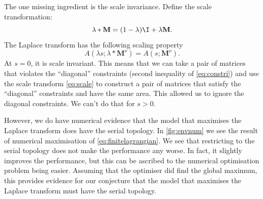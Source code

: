 \documentclass[12pt]{article}
\newcommand{\M}{\mathbf{M}}
\begin{document}
The one missing ingredient is the scale invariance.
Define the scale transformation:
%
\begin{equation}\label{eq:scale}
  \lambda * \M = (1-\lambda)\I + \lambda \M.
\end{equation}
%
The Laplace transform has the following scaling property
%
\begin{equation}\label{eqlaplacescale}
  A(\lambda s;\lambda * \M^\nu) = A(s;\M^\nu).
\end{equation}
%
At $s=0$, it is scale invariant.
This means that we can take a pair of matrices that violates the ``diagonal'' constraints (second inequality of \eqref{eq:constri}) and use the scale transform \eqref{eq:scale} to construct a pair of matrices that satisfy the ``diagonal'' constraints and have the same area.
This allowed us to ignore the diagonal constraints.
We can't do that for $s>0$.

However, we do have numerical evidence that the model that maximises the Laplace transform does have the serial topology.
In \autoref{fig:envnum} we see the result of numerical maximisation of \eqref{eq:finitelagrangian}.
We see that restricting to the serial topology does not make the performance any worse.
In fact, it slightly improves the performance, but this can be ascribed to the numerical optimisation problem being easier.
Assuming that the optimiser did find the global maximum, this provides evidence for our conjecture that the model that maximises the Laplace transform must have the serial topology.
\end{document}
